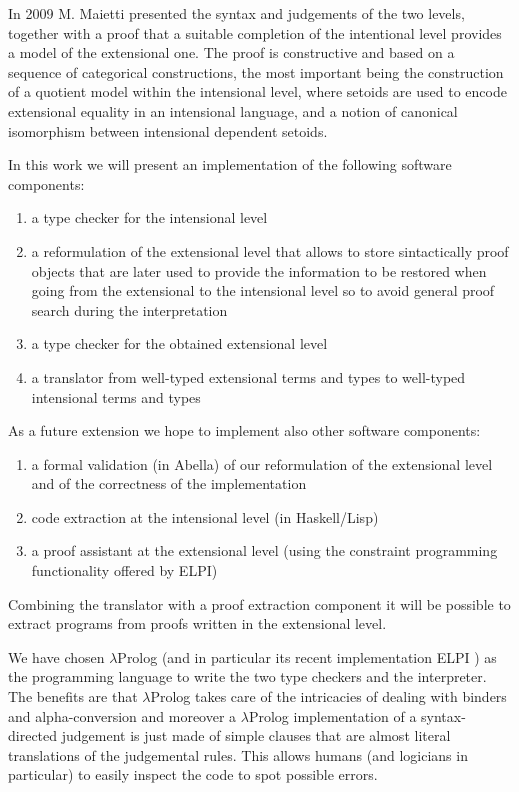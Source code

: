In 2009 M. Maietti \cite{maietti2009minimalist} presented the syntax and judgements of the two levels, together with a proof that a suitable completion of the intentional level provides a model of the extensional one. The proof is constructive and based on a sequence of categorical constructions, the most important being the construction of a quotient model within the intensional level, where setoids are used to encode extensional equality in an intensional language, and a notion of canonical isomorphism between intensional dependent setoids.


In this work we will present an implementation of the following software components:
\begin{enumerate}
	\item a type checker for the intensional level
	\item a reformulation of the extensional level that allows to store sintactically proof objects that are later used to provide the information to be restored when going from the extensional to the intensional level so to avoid general proof search during the interpretation
	\item a type checker for the obtained extensional level
	\item a translator from well-typed extensional terms and types to well-typed intensional terms and types
\end{enumerate}


As a future extension we hope to implement also other software components:
\begin{enumerate}
	\item a formal validation (in Abella) of our reformulation of the extensional level and of the correctness of the implementation
	\item code extraction at the intensional level (in Haskell/Lisp)
	\item a proof assistant at the extensional level (using the constraint programming functionality offered by ELPI)
\end{enumerate}
Combining the translator with a proof extraction component it will be possible to extract programs from proofs written in the extensional level.

We have chosen $\lambda$Prolog \cite{nadathur1988overview}(and in particular its recent implementation ELPI \cite{dunchev2015elpi}) as the programming language to write the two type checkers and the interpreter. The benefits are that $\lambda$Prolog takes care of the intricacies of dealing with binders and alpha-conversion and moreover a $\lambda$Prolog implementation of a syntax-directed judgement is just made of simple clauses that are almost literal translations of the judgemental rules. This allows humans (and logicians in particular) to easily inspect the code to spot possible errors.










